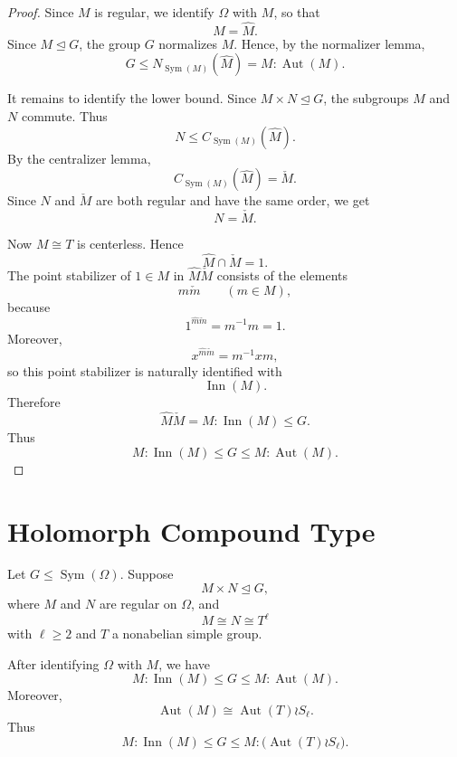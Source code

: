 \begin{proof}
Since \(M\) is regular, we identify \(\Omega\) with \(M\), so that
\[
    M=\widehat M.
\]
Since \(M\unlhd G\), the group \(G\) normalizes \(M\). Hence, by the normalizer
lemma,
\[
    G\leq N_{\operatorname{Sym}(M)}(\widehat M)
    =
    M:\operatorname{Aut}(M).
\]

It remains to identify the lower bound. Since \(M\times N\unlhd G\), the
subgroups \(M\) and \(N\) commute. Thus
\[
    N\leq C_{\operatorname{Sym}(M)}(\widehat M).
\]
By the centralizer lemma,
\[
    C_{\operatorname{Sym}(M)}(\widehat M)=\check M.
\]
Since \(N\) and \(\check M\) are both regular and have the same order, we get
\[
    N=\check M.
\]

Now \(M\cong T\) is centerless. Hence
\[
    \widehat M\cap \check M=1.
\]
The point stabilizer of \(1\in M\) in \(\widehat M\check M\) consists of the
elements
\[
    \widehat m\check m
    \qquad (m\in M),
\]
because
\[
    1^{\widehat m\check m}=m^{-1}m=1.
\]
Moreover,
\[
    x^{\widehat m\check m}
    =
    m^{-1}xm,
\]
so this point stabilizer is naturally identified with
\[
    \operatorname{Inn}(M).
\]
Therefore
\[
    \widehat M\check M
    =
    M:\operatorname{Inn}(M)
    \leq G.
\]
Thus
\[
    M:\operatorname{Inn}(M)
    \leq
    G
    \leq
    M:\operatorname{Aut}(M).
\]
\end{proof}

\section{Holomorph Compound Type}

\begin{theorem}
Let \(G\leq \operatorname{Sym}(\Omega)\). Suppose
\[
    M\times N\unlhd G,
\]
where \(M\) and \(N\) are regular on \(\Omega\), and
\[
    M\cong N\cong T^\ell
\]
with \(\ell\geq 2\) and \(T\) a nonabelian simple group.

After identifying \(\Omega\) with \(M\), we have
\[
    M:\operatorname{Inn}(M)
    \leq
    G
    \leq
    M:\operatorname{Aut}(M).
\]
Moreover,
\[
    \operatorname{Aut}(M)
    \cong
    \operatorname{Aut}(T)\wr S_\ell.
\]
Thus
\[
    M:\operatorname{Inn}(M)
    \leq
    G
    \leq
    M:\bigl(\operatorname{Aut}(T)\wr S_\ell\bigr).
\]
\end{theorem}

